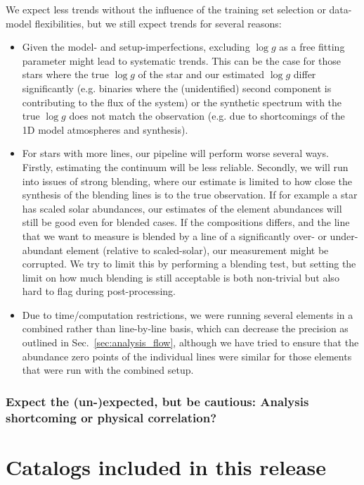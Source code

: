 \documentclass[fleqn,usenatbib,useAMS]{mnras}
\newcommand{\logg}{$\log g$\xspace}
\begin{document}
We expect less trends without the influence of the training set selection or data-model flexibilities, but we still expect trends for several reasons:
\begin{itemize}
\item Given the model- and setup-imperfections, excluding \logg as a free fitting parameter might lead to systematic trends. This can be the case for those stars where the true \logg of the star and our estimated \logg differ significantly (e.g. binaries where the (unidentified) second component is contributing to the flux of the system) or the synthetic spectrum with the true \logg does not match the observation (e.g. due to shortcomings of the 1D model atmospheres and synthesis).
\item For stars with more lines, our pipeline will perform worse several ways. Firstly, estimating the continuum will be less reliable. Secondly, we will run into issues of strong blending, where our estimate is limited to how close the synthesis of the blending lines is to the true observation. If for example a star has scaled solar abundances, our estimates of the element abundances will still be good even for blended cases. If the compositions differs, and the line that we want to measure is blended by a line of a significantly over- or under-abundant element (relative to scaled-solar), our measurement might be corrupted. We try to limit this by performing a blending test, but setting the limit on how much blending is still acceptable is both non-trivial but also hard to flag during post-processing.
\item Due to time/computation restrictions, we were running several elements in a combined rather than line-by-line basis, which can decrease the precision as outlined in Sec.~\ref{sec:analysis_flow}, although we have tried to ensure that the abundance zero points of the individual lines were similar for those elements that were run with the combined setup.
\end{itemize}

\subsubsection{Expect the (un-)expected, but be cautious: Analysis shortcoming or physical correlation?}

\section{Catalogs included in this release}  \label{sec:catalogs}
\end{document}
